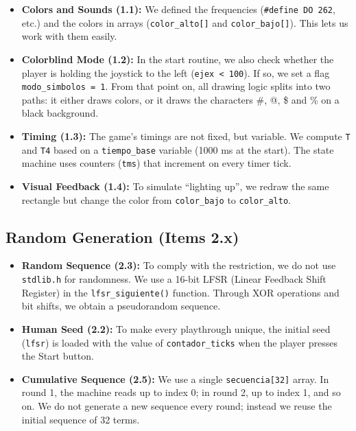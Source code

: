 \documentclass[11pt]{article}
\begin{document}
\begin{itemize}
    \item \textbf{Colors and Sounds (1.1):} We defined the frequencies (\texttt{\#define DO 262}, etc.) and the colors in arrays (\texttt{color\_alto[]} and \texttt{color\_bajo[]}). This lets us work with them easily.

    \item \textbf{Colorblind Mode (1.2):} In the start routine, we also check whether the player is holding the joystick to the left (\texttt{ejex < 100}). If so, we set a flag \texttt{modo\_simbolos = 1}. From that point on, all drawing logic splits into two paths: it either draws colors, or it draws the characters \#, @, \$ and \% on a black background.

    \item \textbf{Timing (1.3):} The game's timings are not fixed, but variable. We compute \texttt{T} and \texttt{T4} based on a \texttt{tiempo\_base} variable (1000 ms at the start). The state machine uses counters (\texttt{tms}) that increment on every timer tick.

    \item \textbf{Visual Feedback (1.4):} To simulate ``lighting up'', we redraw the same rectangle but change the color from \texttt{color\_bajo} to \texttt{color\_alto}.
\end{itemize}

\subsection{Random Generation (Items 2.x)}

\begin{itemize}
    \item \textbf{Random Sequence (2.3):} To comply with the restriction, we do not use \texttt{stdlib.h} for randomness. We use a 16-bit LFSR (Linear Feedback Shift Register) in the \texttt{lfsr\_siguiente()} function. Through XOR operations and bit shifts, we obtain a pseudorandom sequence.

    \item \textbf{Human Seed (2.2):} To make every playthrough unique, the initial seed (\texttt{lfsr}) is loaded with the value of \texttt{contador\_ticks} when the player presses the Start button.

    \item \textbf{Cumulative Sequence (2.5):} We use a single \texttt{secuencia[32]} array. In round 1, the machine reads up to index 0; in round 2, up to index 1, and so on. We do not generate a new sequence every round; instead we reuse the initial sequence of 32 terms.
\end{itemize}
\end{document}
